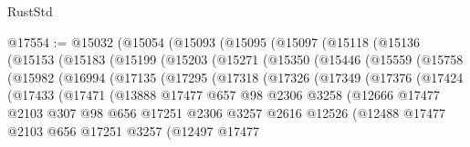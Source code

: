\begin{lexlean}{RustStd}
\begin{coremodule}
@17554 := @15032
    (@15054
      (@15093
        (@15095
          (@15097
            (@15118
              (@15136
                (@15153
                  (@15183
                    (@15199
                      (@15203
                        (@15271
                          (@15350
                            (@15446
                              (@15559
                                (@15758
                                  (@15982
                                    (@16994
                                      (@17135
                                        (@17295
                                          (@17318
                                            (@17326
                                              (@17349
                                                (@17376
                                                  (@17424
                                                    (@17433
                                                      (@17471
                                                        (@13888
                                                          @17477
                                                          @657
                                                          @98
                                                          @2306
                                                          @3258
                                                          (@12666
                                                            @17477
                                                            @2103
                                                            @307
                                                            @98
                                                            @656
                                                            @17251
                                                            @2306
                                                            @3257
                                                            @2616
                                                            @12526
                                                            (@12488
                                                              @17477
                                                              @2103
                                                              @656
                                                              @17251
                                                              @3257
                                                              (@12497
                                                                @17477

\end{coremodule}
\end{lexlean}

